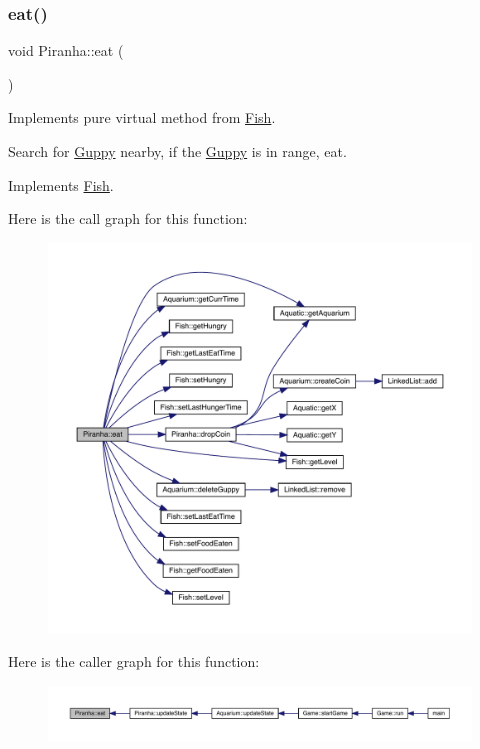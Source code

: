 \subsubsection{\texorpdfstring{eat()}{eat()}}
{\footnotesize\ttfamily void Piranha\+::eat (\begin{DoxyParamCaption}{ }\end{DoxyParamCaption})\hspace{0.3cm}{\ttfamily [virtual]}}



Implements pure virtual method from \mbox{\hyperlink{class_fish}{Fish}}. 

Search for \mbox{\hyperlink{class_guppy}{Guppy}} nearby, if the \mbox{\hyperlink{class_guppy}{Guppy}} is in range, eat. 

Implements \mbox{\hyperlink{class_fish_af209980bd39b8de9b4bb38b7ad4edd04}{Fish}}.

Here is the call graph for this function\+:\nopagebreak
\begin{figure}[H]
\begin{center}
\leavevmode
\includegraphics[width=350pt]{class_piranha_ac48c0256edd56c427b3d82f6e0d4df82_cgraph}
\end{center}
\end{figure}
Here is the caller graph for this function\+:\nopagebreak
\begin{figure}[H]
\begin{center}
\leavevmode
\includegraphics[width=350pt]{class_piranha_ac48c0256edd56c427b3d82f6e0d4df82_icgraph}
\end{center}
\end{figure}
\mbox{\label{class_piranha_a6b86e73b3e5a57ee0fdb768c24ab9b67}} 
